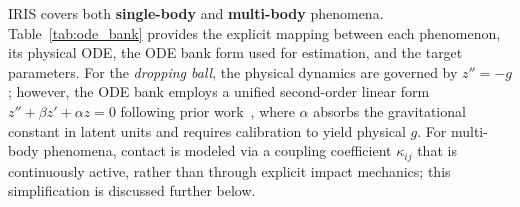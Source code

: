 \documentclass[runningheads]{llncs}
\begin{document}
IRIS covers both \textbf{single-body} and \textbf{multi-body} phenomena. Table~\ref{tab:ode_bank} provides the explicit mapping between each phenomenon, its physical ODE, the ODE bank form used for estimation, and the target parameters. For the \emph{dropping ball}, the physical dynamics are governed by $z'' = -g$; however, the ODE bank employs a unified second-order linear form $z'' + \beta z' + \alpha z = 0$ following prior work~\cite{hofherr2023neural, jaques2019physics}, where $\alpha$ absorbs the gravitational constant in latent units and requires calibration to yield physical $g$. For multi-body phenomena, contact is modeled via a coupling coefficient $\kappa_{ij}$ that is continuously active, rather than through explicit impact mechanics; this simplification is discussed further below.
\end{document}
